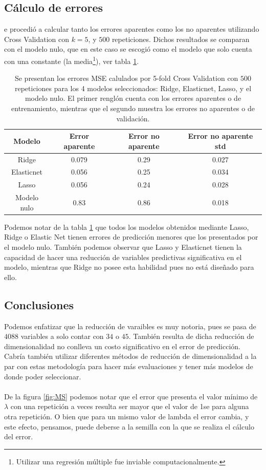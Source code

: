 \documentclass[11pt]{article}
\begin{document}
\subsection{Cálculo de errores}
e procedió a calcular tanto los errores aparentes como los no aparentes utilizando Cross Validation con $k=5$, y $500$ repeticiones. Dichos resultados se comparan con el modelo nulo, que en este caso se escogió como el modelo que solo cuenta con una constante (la media\footnote{Utilizar una regresión múltiple fue inviable computacionalmente.}), ver tabla \ref{tabla:ME}.  
\begin{table}[htbp]
\begin{center}
\begin{tabular}{c|c|c|c}
\toprule
Modelo       &  Error aparente  &  Error no aparente  & Error no aparente std  \\ 
\midrule
Ridge        &     0.079      &      0.29       &  0.027  \\
Elasticnet   &     0.056      &      0.25       &  0.034  \\
Lasso        &     0.056      &      0.24       &  0.028  \\
Modelo nulo  &     0.83       &      0.86       &  0.018  \\
\bottomrule
\end{tabular}
\caption{Se presentan los errores MSE calulados por 5-fold Cross Validation con $500$ repeticiones para los 4 modelos seleccionados: Ridge, Elasticnet, Lasso, y el modelo nulo. El primer renglón cuenta con los errores aparentes o de entrenamiento, mientras que el segundo muestra los errores no aparentes o de validación.}
\label{tabla:ME}
\end{center}
\end{table}
Podemos notar de la tabla \ref{tabla:ME} que todos los modelos obtenidos mediante Lasso, Ridge o Elastic Net tienen errores de predicción menores que los presentados por el modelo nulo. También podemos observar que Lasso y Elasticnet tienen la capacidad de hacer una reducción de variables predictivas significativa en el modelo, mientras que Ridge no posee esta habilidad pues no está diseñado para ello.
\subsection{Conclusiones} 
Podemos enfatizar que la reducción de varaibles es muy notoria, pues se pasa de $4088$ variables a solo contar con $34$ o $45$. También resulta de dicha reducción de dimensionalidad no conlleva un costo significativo en el error de predicción. Cabría también utilizar diferentes métodos de reducción de dimensionalidad a la par con estas metodología para hacer más evaluaciones y tener más modelos de donde poder seleccionar.
\\
\\
De la figura \ref{fig:MS} podemos notar que el error que presenta el valor mínimo de $\lambda$ con una repetición a veces resulta ser mayor que el valor de 1se para alguna otra repetición. O bien que para un mismo valor de lambda el error cambia, y este efecto, pensamos, puede deberse a la semilla con la que se realiza el cálculo del error.
\pagebreak
\end{document}
